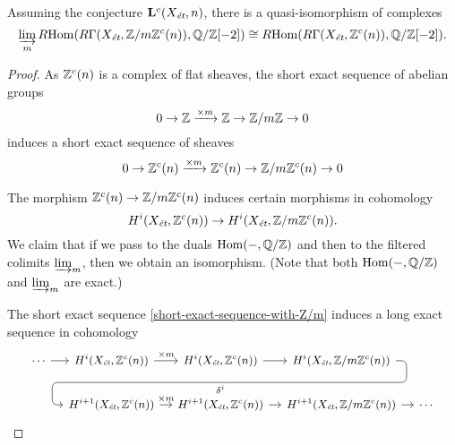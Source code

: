 \documentclass{article}
\numberwithin{equation}{section}
\begin{document}
\begin{proposition}
  \label{prop:a-quasi-isomorphism-with-dirlim}
  Assuming the conjecture $\mathbf{L}^c (X_\et, n)$, there is
  a quasi-isomorphism of complexes
  \[ \varinjlim_m \RHom (R\Gamma (X_\et, \ZZ/m\ZZ^c (n)), \QQ/\ZZ [-2]) \cong
  \RHom (R\Gamma (X_\et, \ZZ^c (n)), \QQ/\ZZ [-2]). \]

  \begin{proof}
    As $\ZZ^c (n)$ is a complex of flat sheaves, the short exact sequence of
    abelian groups
    $$0 \to \ZZ \xrightarrow{\times m} \ZZ \to \ZZ/m\ZZ \to 0$$
    induces a short exact sequence of sheaves
    \begin{equation}
      \label{short-exact-sequence-with-Z/m}
      0 \to \ZZ^c (n) \xrightarrow{\times m} \ZZ^c (n) \to \ZZ/m\ZZ^c (n) \to 0
    \end{equation}

    The morphism $\ZZ^c (n) \to \ZZ/m\ZZ^c (n)$ induces certain morphisms in
    cohomology
    $$H^i (X_\et, \ZZ^c (n)) \to H^i (X_\et, \ZZ/m\ZZ^c (n)).$$
    We claim that if we pass to the duals $\Hom (-, \QQ/\ZZ)$ and then to the
    filtered colimits $\varinjlim_m$, then we obtain an isomorphism.
    (Note that both $\Hom (-, \QQ/\ZZ)$ and $\varinjlim_m$ are exact.)

    The short exact sequence \eqref{short-exact-sequence-with-Z/m} induces
    a long exact sequence in cohomology
    \[ \begin{tikzcd}[column sep=1em,font=\small]
      \cdots\ar{r} & H^i (X_\et, \ZZ^c (n)) \ar{r}{\times m} & H^i (X_\et, \ZZ^c (n))\ar{r} \ar[draw=none]{d}[name=X, anchor=center]{} & H^i (X_\et, \ZZ/m\ZZ^c (n)) \ar[rounded corners,to path={ -- ([xshift=2ex]\tikztostart.east) |- (X.center) \tikztonodes -| ([xshift=-2ex]\tikztotarget.west) -- (\tikztotarget)}]{dll}[at end]{\delta^i} \\
      & H^{i+1} (X_\et, \ZZ^c (n)) \ar{r}{\times m} & H^{i+1} (X_\et, \ZZ^c (n))\ar{r} & H^{i+1} (X_\et, \ZZ/m\ZZ^c (n)) \ar{r} & \cdots
    \end{tikzcd} \]


\end{proof}
\end{proposition}
\end{document}
